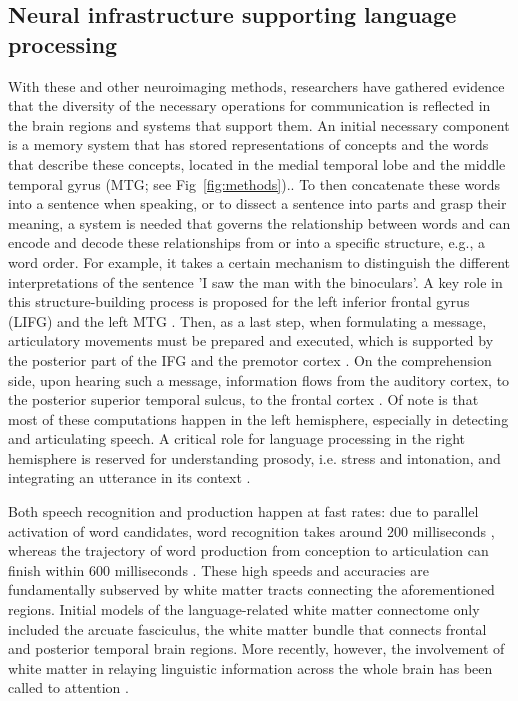 \subsection*{Neural infrastructure supporting language processing} 

With these and other neuroimaging methods, researchers have gathered evidence that the diversity of the necessary operations for communication is reflected in the brain regions and systems that support them. An initial necessary component is a memory system that has stored representations of concepts and the words that describe these concepts, located in the medial temporal lobe and the middle temporal gyrus (MTG; see Fig~\ref{fig:methods}).. To then concatenate these words into a sentence when speaking, or to dissect a sentence into parts and grasp their meaning, a system is needed that governs the relationship between words and can encode and decode these relationships from or into a specific structure, e.g., a word order. For example, it takes a certain mechanism to distinguish the different interpretations of the sentence 'I saw the man with the binoculars'. A key role in this structure-building process is proposed for the left inferior frontal gyrus (LIFG) and the left MTG \citep{giglio2022,hagoort2017}. Then, as a last step, when formulating a message, articulatory movements must be prepared and executed, which is supported by the posterior part of the IFG and the premotor cortex \citep[PM; ][]{hickok2007}. On the comprehension side, upon hearing such a message, information flows from the auditory cortex, to the posterior superior temporal sulcus, to the frontal cortex \citep{friederici2012}. Of note is that most of these computations happen in the left hemisphere, especially in detecting and articulating speech. A critical role for language processing in the right hemisphere is reserved for understanding prosody, i.e. stress and intonation, and integrating an utterance in its context \citep{beaucousin2006,vigneau2011}.


Both speech recognition and production happen at fast rates: due to parallel activation of word candidates, word recognition takes around 200 milliseconds \citep{mcclelland1986}, whereas the trajectory of word production from conception to articulation can finish within 600 milliseconds \citep{indefrey2004}. These high speeds and accuracies are fundamentally subserved by white matter tracts connecting the aforementioned regions. Initial models of the language-related white matter connectome only included the arcuate fasciculus, the white matter bundle that connects frontal and posterior temporal brain regions. More recently, however, the involvement of white matter in relaying linguistic information across the whole brain has been called to attention \citep{przezdzik2019,tyler2007}.  

